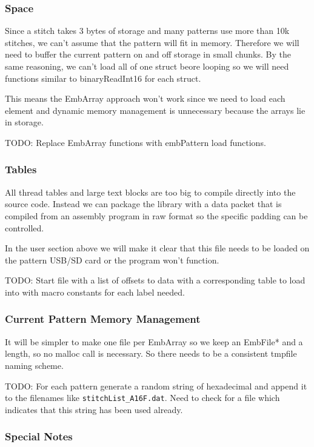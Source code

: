 \documentclass[a4paper, 11pt]{report}
\begin{document}
\subsubsection{Space}

Since a stitch takes 3 bytes of storage and many patterns use more than
10k stitches, we can't assume that the pattern will fit in memory. Therefore
we will need to buffer the current pattern on and off storage in small
chunks. By the same reasoning, we can't load all of one struct beore
looping so we will need functions similar to binaryReadInt16 for each
struct.

This means the EmbArray approach won't work since we need to load
each element and dynamic memory management is unnecessary because
the arrays lie in storage.

TODO: Replace EmbArray functions with embPattern load functions.

\subsubsection{Tables}

All thread tables and large text blocks are too big to compile directly
into the source code. Instead we can package the library with a data packet
that is compiled from an assembly program in raw format so the specific
padding can be controlled.

In the user section above we will make it clear that this file
needs to be loaded on the pattern USB/SD card or the program won't function.

TODO: Start file with a list of offsets to data with a corresponding table
to load into with macro constants for each label needed.

\subsubsection{Current Pattern Memory Management}

It will be simpler to make one file per EmbArray so we keep an EmbFile*
and a length, so no malloc call is necessary. So there needs to be a consistent
tmpfile naming scheme.

TODO: For each pattern generate a random string of hexadecimal and append it
to the filenames like \texttt{stitchList\_A16F.dat}. Need to check for a file
which indicates that this string has been used already.

\subsubsection{Special Notes}
\end{document}
